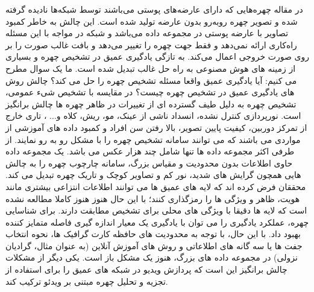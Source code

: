 \noindent
در مقاله \cite{8603840} چهره‌هایی که دارای عارضه‌های پوستی می‌باشند توسط شبکه‌ها نادیده گرفته شده و تصویر چهره روبه‌رو بدون عارضه تولید شده است. این چالش به خاطر کمبود تصاویر با عارضه پوستی در مجموعه داده می‌باشد و شبکه در مواجه با این مسئله راه‌کاری ارائه نمی‌دهد و فقط جهت چهره را تغییر می‌دهد و بافت غالب صورت را بر روی صورت خروجی اعمال می‌کند.
\noindent
به تازگی یادگیری عمیق در تشخیص چهره و بسیاری از زمینه های هوش مصنوعی به راه حل غالب تبدیل شده است. ما یک سوال مطرح می کنیم: آیا یادگیری عمیق واقعا مسئله تشخیص چهره را حل می کند؟ چالش روش های یادگیری عمیق در تشخیص چهره چیست؟ 
\noindent
در مقایسه با تشخیص شیء عمومی، تشخیص چهره به دلیل طیف گسترده ای از تغییرات در ظاهر چهره ها چالش برانگیز است. نورپردازی کنترل نشده، انسداد ناشی از عینک، مو، ریش، کلاه و... ، تاری خارج از تمرکز دوربین، کیفیت پایین تصویر، بالا رفتن سن افراد و کمبود داده های آموزشی از مواردی می باشند که می توانند سامانه تشخیص چهره را با مشکل رو به رو نمایند.
\noindent
از طرفی اکثر مجموعه داده ها تنها شامل چند هزار عکس می باشد. یک مجموعه داده حاوی اطلاعات بدون محدودیت و مقیاس بزرگ، سامانه چارچوب چهره را به چالش هایی همچون گرایش های شدید، نور کم و تصاویر کوچک و تاریک چهره تبدیل می کند. محققان فرض کرده اند که لایه های عمیق  ها می توانند اطلاعات انتزاعی بیشتری مانند هویت، ظاهر و ویژگی ها را رمزگذاری کنند؛ با این حال هنوز هنوز کاملا مطالعه نشده است که لایه ها دقیقا با ویژگی های محلی برای تشخیص مطابقت دارند.
\noindent
برای شناسایی چهره، عملکرد یادگیری را می توان با یادگیری یک معیار اندازه گیری فاصله متمایز کننده بهبود داد. با این حال، با توجه به محدودیت های حافظه کارت گرافیک ها، نحوه انتخاب جفت ها یا سه گانه های اطلاعاتی و روش های آموزش آنلاین (به عنوان مثال، گرادیان نزولی) در مجموعه داده های بزرگ، هنوز یک مشکل باز است. یکی دیگر از مشکلات چالش برانگیز این است که پردازش ویدیو در شبکه های عمیق را برای استفاده از تجزیه و تحلیل چهره مبتنی بر ویدئو ترکیب کند.
